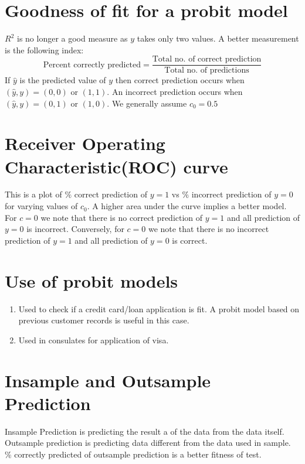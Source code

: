 \documentclass[notoc]{tufte-book}
\begin{document}
\section{Goodness of fit for a probit model}
$R^2$ is no longer a good measure as $y$ takes only two values. A better measurement is the following index:
$$\text{Percent correctly predicted}=\frac{\text{Total no. of correct prediction}}{\text{Total no. of predictions}}$$
If $\hat y$ is the predicted value of $y$ then correct prediction occurs when $(\hat y,y)=(0,0)$ or $(1,1)$. An incorrect prediction occurs when $(\hat y,y)=(0,1)$ or $(1,0)$. We generally assume $c_0=0.5$
\section{Receiver Operating Characteristic(ROC) curve}
This is a plot of $\%$ correct prediction of $y=1$ vs $\%$ incorrect prediction of $y=0$ for varying values of $c_0$. A higher area under the curve implies a better model. For $c=0$ we note that there is no correct prediction of $y=1$ and all prediction of $y=0$ is incorrect. Conversely, for $c=0$ we note that there is no incorrect prediction of $y=1$ and all prediction of $y=0$ is correct.
\section{Use of probit models}
\begin{enumerate}
    \item Used to check if a credit card/loan application is fit. A probit model based on previous customer records is useful in this case.
    \item Used in consulates for application of visa. 
\end{enumerate}
\section{Insample and Outsample Prediction}
Insample Prediction is predicting the result a of the data from the data itself. Outsample prediction is predicting data different from the data used in sample. \% correctly predicted of outsample prediction is a better fitness of test.
\end{document}
